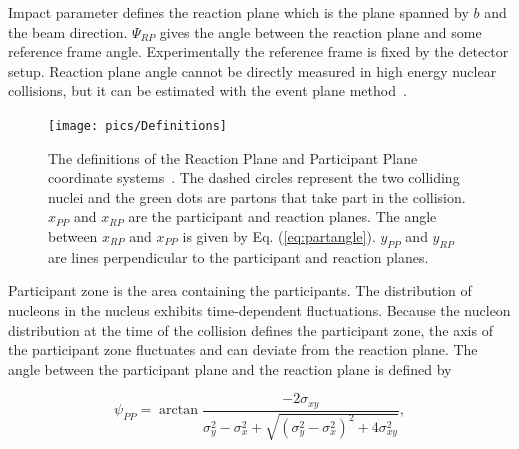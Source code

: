 Impact parameter defines the reaction plane which is the plane spanned by $b$ and the beam direction. $\Psi_{RP}$ gives the angle between the reaction plane and some reference frame angle. Experimentally the reference frame is fixed by the detector setup. Reaction plane angle cannot be directly measured in high energy nuclear collisions, but it can be estimated with the event plane method~\cite{Voloshin:2008dg}. 
\begin{figure}[h!]
\centering
%      

\texttt{[image: pics/Definitions]}
\caption[The definitions of the Reaction Plane and Participant Plane coordinate systems]{The definitions of the Reaction Plane and Participant Plane coordinate systems~\cite{Voloshin:2007pc}. The dashed circles represent the two colliding nuclei and the green dots are partons that take part  in the collision. $x_{PP}$ and $x_{RP}$ are the participant and reaction planes. The angle between $x_{RP}$ and $x_{PP}$ is given by Eq. (\ref{eq:partangle}). $y_{PP}$ and $y_{RP}$ are lines perpendicular to the participant and reaction planes. }
\label{fig:planes}
\end{figure}


Participant zone is the area containing the participants. The distribution of nucleons in the nucleus exhibits time-dependent fluctuations. Because the nucleon distribution at the time of the collision defines the participant zone, the axis of the participant zone fluctuates and can deviate from the reaction plane. The angle between the participant plane and the reaction plane is defined by ~\cite{Holopainen:2010gz}

\begin{equation}
\psi_{PP}=\arctan \frac{-2\sigma_{xy}}{\sigma_y^2-\sigma_x^2+\sqrt{\left(\sigma_y^2-\sigma_x^2\right)^2+4\sigma_{xy}^2}},
\label{eq:partangle}
\end{equation}

